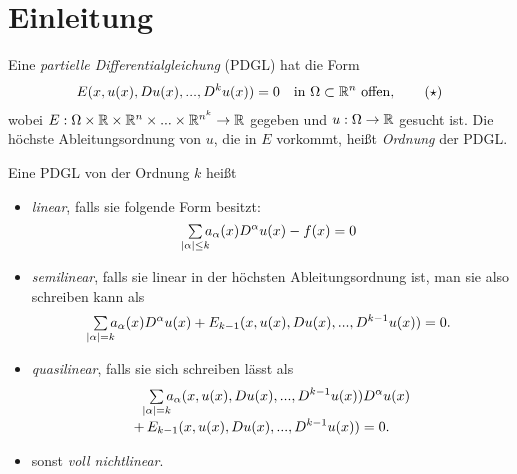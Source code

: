 \documentclass{cheat-sheet}
\begin{document}


\section{Einleitung}



\begin{defn}
  Eine \emph{partielle Differentialgleichung} (PDGL) hat die Form
  \begin{align*}
    E(x, u(x), Du(x), ..., D^k u(x)) = 0 \quad \text{in $\Omega \subset \mathbb{R}^n$ offen}, \tag{$\star$}
  \end{align*}
  wobei $E : \Omega \times \mathbb{R} \times \mathbb{R}^n \times ... \times \mathbb{R}^{n^k} \to \mathbb{R}$ gegeben und $u : \Omega \to \mathbb{R}$ gesucht ist.
  Die höchste Ableitungsordnung von $u$, die in $E$ vorkommt, heißt \emph{Ordnung} der PDGL.
\end{defn}


\begin{defn}
  Eine PDGL von der Ordnung $k$ heißt
  \begin{itemize}
    \item \emph{linear}, falls sie folgende Form besitzt:
    \[ \sum_{\mathclap{\abs{\alpha} \leq k}} a_\alpha(x) D^{\alpha} u(x) - f(x) = 0 \]
    \item \emph{semilinear}, falls sie linear in der höchsten Ableitungsordnung ist, man sie also schreiben kann als
    \[ \sum_{\mathclap{\abs{\alpha} = k}} a_\alpha(x) D^{\alpha} u(x) + E_{k-1}(x, u(x), Du(x), ..., D^{k-1} u(x)) = 0. \]
    \item \emph{quasilinear}, falls sie sich schreiben lässt als
    \begin{align*}
      & \sum_{\mathclap{\abs{\alpha} = k}} a_\alpha(x, u(x), D u(x), ..., D^{k-1} u(x)) D^{\alpha} u(x)\\[-3pt]
      +\, & E_{k-1}(x, u(x), D u(x), ..., D^{k-1} u(x)) = 0.
    \end{align*}
    \item sonst \emph{voll nichtlinear}.
  \end{itemize}
\end{defn}
\end{document}
